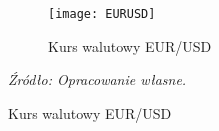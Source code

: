 \vspace{-1cm}

\hypertarget{fig108}{}
\begin{figure}[H]
\ContinuedFloat
\centering
\begin{subfigure}{.5\textwidth}
\caption{Kurs walutowy EUR/USD}
\hspace{-3cm}\texttt{[image: EURUSD]}
\end{subfigure}
\vspace{-0.75cm}
\begin{flushleft}
\hspace{1cm}\textit{\footnotesize{Źródło: Opracowanie własne.}} \\
\end{flushleft}
\end{figure}
